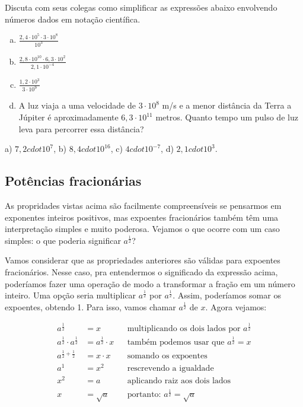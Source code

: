 \documentclass[main.tex]{subfiles}
\begin{document}
\begin{questao}
Discuta com seus colegas como simplificar as expressões abaixo envolvendo números dados em notação científica.
\begin{enumerate}[a)]
\item $\frac{2,4  \cdot 10^5 \cdot 3  \cdot 10^8}{10^3}$
\item $\frac{2,8  \cdot 10^{10} \cdot 6,3  \cdot 10^2}{2,1 \cdot 10^{-4}}$
\item $\frac{1,2  \cdot 10^3}{3 \cdot 10^9}$
\item A luz viaja a uma velocidade de $3 \cdot 10^8$ m/s e a menor distância da Terra a Júpiter é aproximadamente $6,3 \cdot 10^{11}$ metros. Quanto tempo um pulso de luz leva para percorrer essa distância?
\end{enumerate}
\end{questao}

\begin{gabarito}
	\begin{gabaritoQuestao}
		a) $7,2 cdot 10^{7}$, b) $8,4 cdot 10^{16}$, c) $4 cdot 10^{-7}$, d) $2,1 cdot 10^{3}$.
	\end{gabaritoQuestao}
\end{gabarito}

\subsection*{Potências fracionárias}

As propridades vistas acima são facilmente compreensíveis se pensarmos em exponentes inteiros positivos, mas expoentes fracionários também têm uma interpretação simples e muito poderosa. Vejamos o que ocorre com um caso simples: o que poderia significar $a^\frac{1}{2}$? 

Vamos considerar que as propriedades anteriores são válidas para expoentes fracionários. Nesse caso, pra entendermos o significado da expressão acima, poderíamos fazer uma operação de modo a transformar a fração em um número inteiro. Uma opção seria multiplicar $a^\frac{1}{2}$ por $a^\frac{1}{2}$. Assim, poderíamos somar os expoentes, obtendo 1. Para isso, vamos chamar $a^\frac{1}{2}$ de $x$. Agora vejamos:

\begin{align*}
a^\frac{1}{2} &= x && \text{multiplicando os dois lados por } a^\frac{1}{2} \\
a^\frac{1}{2} \cdot a^\frac{1}{2} &= a^\frac{1}{2} \cdot x && \text{também podemos usar que } a^\frac{1}{2} = x \\
a^{\frac{1}{2}+\frac{1}{2}} &= x \cdot x && \text{somando os expoentes}\\
a^1 &= x^2 && \text{rescrevendo a igualdade}\\
x^2 &= a && \text{aplicando raiz aos dois lados}\\
x &= \sqrt{a} && \text{portanto: } a^\frac{1}{2} = \sqrt{a} \\
\end{align*}
\end{document}
